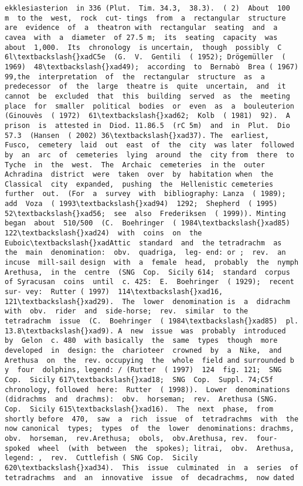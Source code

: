 \documentclass[11pt]{article}
\begin{document}
\begin{Verbatim}[commandchars=\\\{\}]
ekklesiasterion  in 336 (Plut.  Tim. 34.3,  38.3).  ( 2)  About  100  m  to the  west,  rock  cut- tings  from  a  rectangular  structure  are  evidence  of  a  theatron with  rectangular  seating  and  a  cavea  with  a  diameter  of 27.5 m;  its  seating  capacity  was  about  1,000.  Its  chronology  is uncertain,  though  possibly  C 6l\textbackslash{}xadC5e  (G.  V.  Gentili  ( 1952); Drögemüller  ( 1969)  48\textbackslash{}xad49);  according  to  Bernabò  Brea ( 1967)  99,the  interpretation  of  the  rectangular  structure  as  a predecessor  of  the  large  theatre is  quite  uncertain,  and  it cannot  be  excluded  that  this  building  served  as  the  meeting place  for  smaller  political  bodies  or  even  as  a  bouleuterion (Ginouvès  ( 1972)  61\textbackslash{}xad62;  Kolb  ( 1981)  92).  A  prison  is  attested in  Diod. 11.86.5  (rC 5m)  and  in  Plut.  Dio 57.3  (Hansen  ( 2002) 36\textbackslash{}xad37). The  earliest,  Fusco,  cemetery  laid  out  east  of  the  city  was later  followed  by  an  arc  of  cemeteries  lying  around  the  city from  there  to  Tyche  in  the  west.  The  Archaic  cemeteries  in the  outer  Achradina  district  were  taken  over  by  habitation when  the  Classical  city  expanded,  pushing  the  Hellenistic cemeteries  further  out.  (For  a  survey  with  bibliography: Lanza  ( 1989);  add  Voza  ( 1993\textbackslash{}xad94)  1292;  Shepherd  ( 1995) 52\textbackslash{}xad56;  see  also  Frederiksen  ( 1999)). Minting  began  about  510/500  (C.  Boehringer  ( 1984\textbackslash{}xad85) 122\textbackslash{}xad24)  with  coins  on  the  Euboic\textbackslash{}xadAttic  standard  and  the tetradrachm  as  the  main  denomination:  obv.  quadriga,  leg- end: or ;  rev.  an  incuse  mill-sail design  with  a  female  head,  probably  the  nymph  Arethusa,  in the  centre  (SNG  Cop.  Sicily 614;  standard  corpus  of Syracusan  coins  until  c. 425:  E.  Boehringer  ( 1929);  recent  sur- vey:  Rutter ( 1997)  114\textbackslash{}xad16,  121\textbackslash{}xad29).  The  lower  denomination is  a  didrachm  with  obv.  rider  and  side-horse;  rev.  similar  to the  tetradrachm  issue  (C.  Boehringer  ( 1984\textbackslash{}xad85)  pl. 13.8\textbackslash{}xad9). A  new  issue  was  probably  introduced  by  Gelon  c. 480  with basically  the  same  types  though  more  developed  in  design: the  charioteer  crowned  by  a  Nike,  and  Arethusa  on  the  rev. occupying  the  whole  field and surrounded b y  four  dolphins, legend: / (Rutter  ( 1997)  124  fig. 121;  SNG Cop.  Sicily 617\textbackslash{}xad18;  SNG  Cop.  Suppl. 74;C5f  chronology, followed  here:  Rutter  ( 1998)).  Lower  denominations (didrachms  and  drachms):  obv.  horseman;  rev.  Arethusa (SNG.  Cop.  Sicily 615\textbackslash{}xad16).  The  next  phase,  from  shortly before  470,  saw  a  rich  issue  of  tetradrachms  with  the  now canonical  types;  types  of  the  lower  denominations: drachms,  obv.  horseman,  rev.Arethusa;  obols,  obv.Arethusa, rev.  four-spoked  wheel  (with  between  the  spokes); litrai,  obv.  Arethusa,  legend: ,  rev.  Cuttlefish ( SNG Cop.  Sicily 620\textbackslash{}xad34).  This  issue  culminated  in  a  series  of tetradrachms  and  an  innovative  issue  of  decadrachms,  now dated  
\end{Verbatim}
\end{document}
